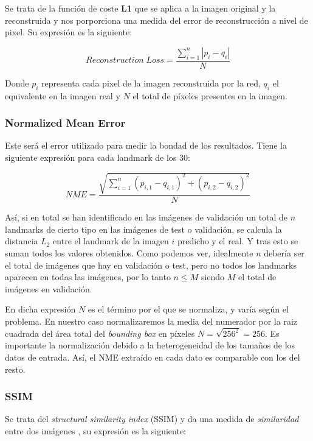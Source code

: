             \medskip

            \noindent Se trata de la función de coste \textbf{L1} que se aplica a la imagen original y la reconstruida  y nos porporciona una medida del error de reconstrucción a nivel de pixel. Su expresión es la siguiente:

            \begin{equation*}
                Reconstruction \; Loss = \frac{\sum_{i=1}^n |p_i -q_i|}{N}
            \end{equation*}

            \noindent Donde $p_i$ representa cada pixel de la imagen reconstruida por la red, $q_i$ el equivalente en la imagen real y $N$ el total de píxeles presentes en la imagen.

        \subsubsection{Normalized Mean Error}
            \noindent Este será el error utilizado para medir la bondad de los resultados. Tiene la siguiente expresión para cada landmark de los $30$: 

            \begin{equation*}
                NME=\frac{\sqrt{\sum_{i=1}^{n}(p_{i,1} -q_{i,1})^2+ (p_{i,2} -q_{i,2})^2}}{N}
            \end{equation*}


            \noindent Así, si en total se han identificado en las imágenes de validación un total de $n$ landmarks de cierto tipo en las imágenes de test o validación, se calcula la distancia $L_2$ entre el landmark de la imagen $i$ predicho y el real. Y tras esto se suman todos los valores obtenidos. Como podemos ver, idealmente $n$ debería ser el total de imágenes que hay en validación o test, pero no todos los landmarks aparecen en todas las imágenes, por lo tanto $n\leq M$ siendo $M$ el total de imágenes en validación.

            \noindent En dicha expresión $N$ es el término por el que se normaliza, y varía según el problema. En nuestro caso normalizaremos la media del numerador por la raiz cuadrada del área total del \textit{bounding box} en píxeles $N=\sqrt{256^2}=256$. Es importante la normalización debido a la heterogeneidad de los tamaños de los datos de entrada. Así, el NME extraído en cada dato es comparable con los del resto.

            \subsubsection{SSIM}
            \noindent Se trata del \textit{structural similarity index} (SSIM) y da una medida de \textit{similaridad} entre dos imágenes \cite{wang2004image}, su expresión es la siguiente: 

